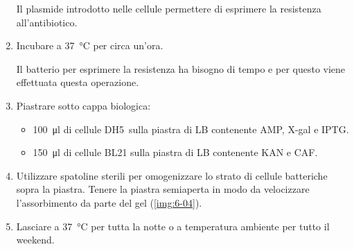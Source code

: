 \begin{enumerate}
\begin{Note}
		      \vspace{0.1cm}
		      Il plasmide introdotto nelle cellule permettere di esprimere la resistenza all'antibiotico.
	      \end{Note}
	\item Incubare a \qty{37}{\celsius} per circa un’ora.
	      \begin{Note}
		      Il batterio per esprimere la resistenza ha bisogno di tempo e per questo viene effettuata questa operazione.
	      \end{Note}
	\item Piastrare sotto cappa biologica:
	      \begin{itemize}
		      \item \qty{100}{\micro\litre} di cellule DH5\textalpha\ sulla piastra di LB contenente \gls{AMP}, \gls{X-gal} e \gls{IPTG}.
		      \item \qty{150}{\micro\litre} di cellule BL21 sulla piastra di LB contenente \gls{KAN} e \gls{CAF}.
	      \end{itemize}
	\item Utilizzare spatoline sterili per omogenizzare lo strato di cellule batteriche sopra la piastra. Tenere la piastra semiaperta in modo da velocizzare l’assorbimento da parte del gel (\autoref{img:6-04}).
	\item Lasciare a \qty{37}{\celsius} per tutta la notte o a temperatura ambiente per tutto il \foreignlanguage{english}{weekend}.
\end{enumerate}

\vspace{.5cm}
